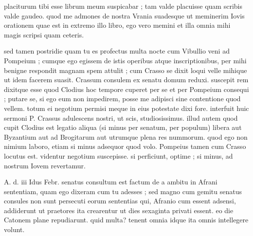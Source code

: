


 placiturum tibi esse librum meum suspicabar ; tam valde placuisse quam scribis valde gaudeo. quod me admones de nostra Vrania suadesque ut meminerim Iovis orationem quae est in extremo illo libro, ego vero memini et illa omnia mihi magis scripsi quam ceteris.

 sed tamen postridie quam tu es profectus multa nocte cum Vibullio veni ad Pompeium ; cumque ego egissem de istis operibus atque inscriptionibus, per mihi benigne respondit magnam spem attulit ; cum Crasso se dixit loqui velle mihique ut idem facerem suasit. Crassum consulem ex senatu domum reduxi. suscepit rem dixitque esse quod Clodius hoc tempore cuperet per se et per Pompeium consequi ; putare se, si ego eum non impedirem, posse me adipisci sine contentione quod vellem. totum ei negotium permisi meque in eius potestate dixi fore. interfuit huic sermoni P. Crassus adulescens nostri, ut scis, studiosissimus. illud autem quod cupit Clodius est legatio aliqua (si minus per senatum, per populum) libera aut Byzantium aut ad Brogitarum aut utrumque plena res nummorum. quod ego non nimium laboro, etiam si minus adsequor quod volo. Pompeius tamen cum Crasso locutus est. videntur negotium suscepisse. si perficiunt, optime ; si minus, ad nostrum Iovem revertamur.

 A. d. iii Idus Febr. senatus consultum est factum de a ambitu in Afrani sententiam, quam ego dixeram cum tu adesses ; sed magno cum gemitu senatus consules non sunt persecuti eorum sententias qui, Afranio cum essent adsensi, addiderunt ut praetores ita crearentur ut dies sexaginta privati essent. eo die Catonem plane repudiarunt. quid multa? tenent omnia idque ita omnis intellegere volunt.
